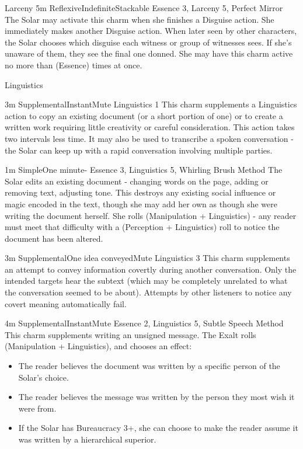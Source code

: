 \begin{Ability}{Larceny}
  {5m}
  {Reflexive}{Indefinite}{Stackable}
  {Essence 3, Larceny 5, Perfect Mirror}
  The Solar may activate this charm when she finishes a Disguise action. She immediately makes another Disguise action. When later seen by other characters, the Solar chooses which disguise each witness or group of witnesses sees. If she's unaware of them, they see the final one donned. She may have this charm active no more than (Essence) times at once.

\end{Ability}

\begin{Ability}{Linguistics}

  {3m}
  {Supplemental}{Instant}{Mute}
  {Linguistics 1}
  This charm supplements a Linguistics action to copy an existing document (or a short portion of one) or to create a written work requiring little creativity or careful consideration. This action takes two intervals less time. It may also be used to transcribe a spoken conversation - the Solar can keep up with a rapid conversation involving multiple parties.

  {1m}
  {Simple}{One minute}{-}
  {Essence 3, Linguistics 5, Whirling Brush Method}
  The Solar edits an existing document - changing words on the page, adding or removing text, adjusting tone. This destroys any existing social influence or magic encoded in the text, though she may add her own as though she were writing the document herself. She rolls (Manipulation + Linguistics) - any reader must meet that difficulty with a (Perception + Linguistics) roll to notice the document has been altered.

  {3m}
  {Supplemental}{One idea conveyed}{Mute}
  {Linguistics 3}
  This charm supplements an attempt to convey information covertly during another conversation. Only the intended targets hear the subtext (which may be completely unrelated to what the conversation seemed to be about). Attempts by other listeners to notice any covert meaning automatically fail.

  {4m}
  {Supplemental}{Instant}{Mute}
  {Essence 2, Linguistics 5, Subtle Speech Method}
  This charm supplements writing an unsigned message. The Exalt rolls (Manipulation + Linguistics), and chooses an effect:

  \begin{itemize}
    \item The reader believes the document was written by a specific person of the Solar's choice.
    \item The reader believes the message was written by the person they most wish it were from.
    \item If the Solar has Bureaucracy 3+, she can choose to make the reader assume it was written by a hierarchical superior.
  \end{itemize}


\end{Ability}
